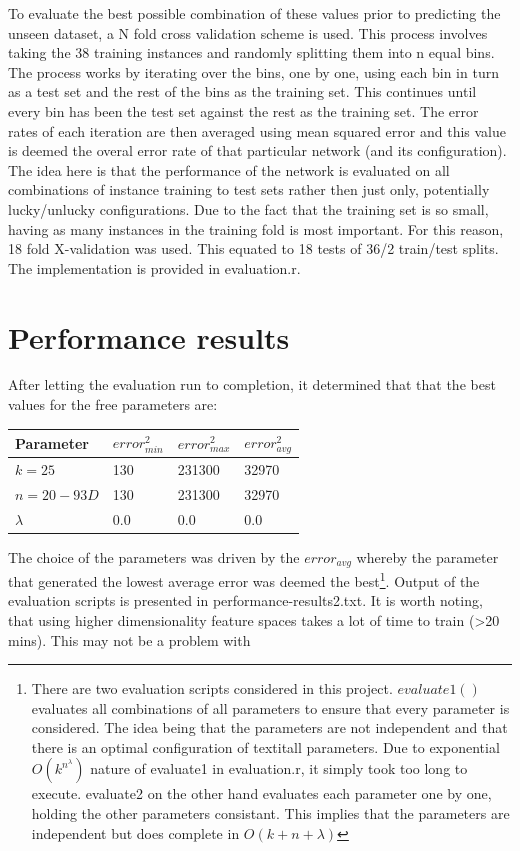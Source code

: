 \documentclass[twocolumn]{article}
\begin{document}
To evaluate the best possible combination of these values prior to predicting the unseen dataset, a N fold cross validation scheme is
used. This process involves taking the 38 training instances and randomly splitting them into n equal bins. The process works by iterating over the
bins, one by one, using each bin in turn as a test set and the rest of the bins as the training set. This continues until every bin has been
the test set against the rest as the training set. The error rates of each iteration are then averaged using mean squared error
and this value is deemed the overal error rate of that particular network (and its configuration). The idea here is that the performance of the 
network is evaluated on all combinations of instance training to test sets rather then just only, potentially lucky/unlucky configurations. 
Due to the fact that the training set is so small, having as many instances in the training fold is most important. For this reason, 
18 fold X-validation was used. This equated to 18 tests of 36/2 train/test splits. The implementation is provided in evaluation.r.

\section{Performance results}
After letting the evaluation run to completion, it determined that that the best values for the free parameters are:

\begin{center}
	\begin{tabular}{| p{15mm} | p{15mm} | p{15mm} | p{15mm} | }
	\hline Parameter & $error_{min}^2$ & $error_{max}^2$ & $error_{avg}^2$\\ \hline
	\( k=25\) & 130 & 231300 & 32970 \\ \hline
	\( n=20 - 93D\) & 130 & 231300 & 32970 \\ \hline
	\( \lambda\) & 0.0 & 0.0 & 0.0 \\ \hline
	\end{tabular} 
\end{center}

The choice of the parameters was driven by the $error_{avg}$ whereby the parameter that generated the lowest average error was deemed the
best\footnote{There are two evaluation scripts considered in this project. $evaluate1()$ evaluates all combinations of all parameters to ensure 
that every parameter is considered. The idea being that the parameters are not independent and that there is an optimal configuration of 
textit{all} parameters. Due to exponential $O(k^{n^{\lambda}})$ nature of evaluate1 in evaluation.r, it simply took too long to execute. 
evaluate2 on the other hand evaluates each parameter one by one, holding the other parameters consistant. This implies that the parameters 
are independent but does complete in $O(k+n+\lambda)$}. Output of the evaluation scripts is presented in performance-results2.txt. It is worth
noting, that using higher dimensionality feature spaces takes a lot of time to train (\textgreater 20 mins). This may not be a problem with 
\end{document}
